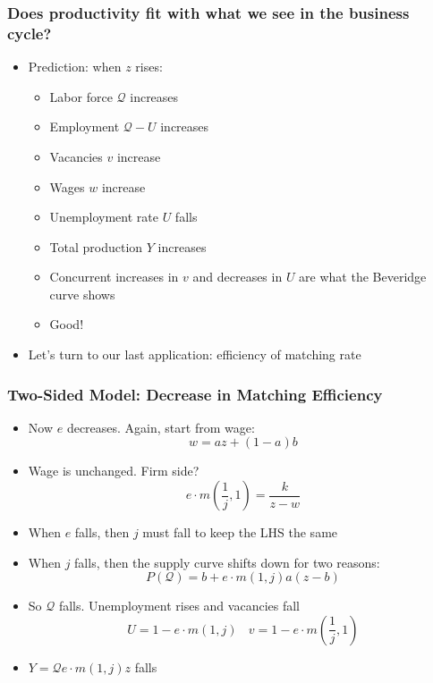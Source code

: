 \documentclass{beamer}
\begin{document}
\begin{frame}
\frametitle[alignment=center]{Does productivity fit with what we see in the business cycle?}
\begin{itemize}
\item Prediction: when $z$ rises:
\begin{itemize}
\item Labor force $\mathcal{Q}$ increases
\item Employment $\mathcal{Q}-U$ increases
\item Vacancies $v$ increase
\item Wages $w$ increase 
\item Unemployment rate $U$ falls
\item Total production $Y$ increases
\item Concurrent increases in $v$ and decreases in $U$ are what the Beveridge curve shows
\item Good!
\end{itemize}
\item Let's turn to our last application: efficiency of matching rate
\end{itemize}
\end{frame}

\begin{frame}
\frametitle[alignment=center]{Two-Sided Model:  Decrease in Matching Efficiency}
\begin{itemize}
\item Now $e$ decreases.  Again, start from wage: 
$$w=az+(1-a)b$$
\item Wage is unchanged. Firm side?
$$e\cdot m\left(\frac{1}{j},1\right)=\frac{k}{z-w}$$
\item When $e$ falls, then $j$ must fall to keep the LHS the same
\item When $j$ falls, then the supply curve shifts down for two reasons:
$$P(\mathcal{Q})=b+e\cdot m(1,j)a(z-b)$$
\item So $\mathcal{Q}$ falls.  Unemployment rises and vacancies fall
$$U=1-e\cdot m(1,j)\ \ \ \ v=1-e\cdot m\left(\frac{1}{j},1\right)$$
\item  $Y=\mathcal{Q}e\cdot m(1,j)z$ falls
\end{itemize}
\end{frame}
\end{document}
